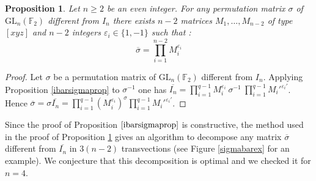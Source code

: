 \documentclass[a4paper,12pt,fleqn]{article}
\newcommand\GL[1][n]{\mathrm{GL}_{#1}(\mathbb{F}_2)}
\renewcommand\epsilon{\varepsilon}
\renewcommand\geq{\geqslant}
\newtheorem{prop}[theo]{Proposition}
\begin{document}
\begin{prop}\label{sigmabarprop}
Let $n\geq  2$ be an even integer. For any permutation matrix $\sigma$ of $\GL[n]$ different from $I_n$ there exists $n-2$ matrices $M_1,\dots,M_{n-2}$ of type $[xyz]$ and $n-2$ integers $\epsilon_i\in\{1,-1\}$ such that :
  \begin{equation}\label{sigmabar}
    \overline{\sigma}=\prod\limits_{i=1}^{n-2}M_i^{\varepsilon_i}
\end{equation}
\end{prop}

\begin{proof} Let $\sigma$ be a  permutation matrix of $\GL[n]$ different from $I_n$. 
  Applying Proposition \ref{ibarsigmaprop} to $\sigma^{-1}$ one has 
  $\overline{ I_n}=\prod\limits_{i=1}^{q-1}M_i^{\varepsilon_i}\ \sigma^{-1}\ \prod\limits_{i=1}^{q-1}M_i'^{\varepsilon_i'}$. Hence 
  $\overline{\sigma}=\sigma\overline{I_n}=\prod\limits_{i=1}^{q-1}\left(M_i^{\varepsilon_i}\right)^{\sigma}\prod\limits_{i=1}^{q-1}M_i'^{\varepsilon_i'}$.
  \end{proof}

  Since the proof of Proposition $\ref{ibarsigmaprop}$ is constructive, the method used in the proof of Proposition \ref{sigmabarprop} gives an algorithm to decompose any matrix $\overline{\sigma}$ different from $\overline{I_n}$ in $3(n-2)$ transvections (see Figure \ref{sigmabarex} for an example). We conjecture that this decomposition is optimal and we checked it for $n=4$.
\end{document}
